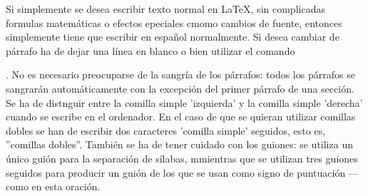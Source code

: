\documentclass[a4paper,10pt]{letter}
\begin{document}
Si simplemente se desea escribir texto normal en \LaTeX{}, 
sin complicadas formulas matemáticas o efectos epeciales
cmomo cambios de fuente, entonces simplemente tiene que escribir
en español normalmente.
Si desea cambiar de párrafo ha de dejar una línea en blanco o bien
utilizar el comando \par.
No es necesario preocuparse de la sangría de los párrafos:
todos los párrafos se sangrarán automáticamente con la excepción
del primer párrafo de una sección.
Se ha de distnguir entre la comilla simple 'izquierda'
y la comilla simple 'derecha' cuando se escribe en el ordenador.
En el caso de que se quieran utilizar comillas dobles se han de
escribir dos caracteres 'comilla simple' seguidos, esto es, 
''comillas dobles''.
También se ha de tener cuidado con los guiones: se utiliza un único
guión para la separación de sílabas, mmientras que se utilizan
tres guiones seguidos para producir un guión de los que se usan
como signo de puntuación --- como en esta oración.
\end{document}
